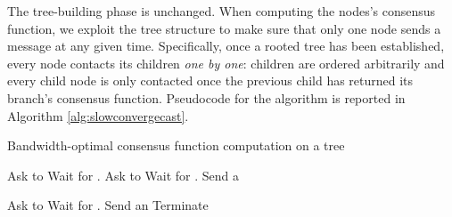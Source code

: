 \documentclass[letterpaper,10pt,conference]{ieeeconf}
\begin{document}
The tree-building phase is unchanged. When computing the nodes's consensus function, we exploit the tree structure to make sure that only one node sends a message at any given time. Specifically, once a rooted tree has been established, every node contacts its children \emph{one by one}: children are ordered arbitrarily and every child node is only contacted once the previous child has returned its branch's consensus function.
Pseudocode for the algorithm is reported in Algorithm \ref{alg:slowconvergecast}.

\begin{algorithm}
\caption{Bandwidth-optimal consensus function computation on a tree} \label{alg:slowconvergecast}
\begin{algorithmic}
\renewcommand{\algorithmicrequire}{\textbf{Input:}}
\renewcommand{\algorithmicensure}{\textbf{Output:}}

\Require  {}
\State  {}
\State  {}
\State  {}
\State  {}

\State{}
\EndIf


	\State Ask  to 
	\State Wait for  .
	\State  {}
\EndFor
{} 
	\State Ask  to 
	\State Wait for  .
\Else
\State Send  a 
\EndIf
\EndProcedure

\State {}
	\State Ask  to 
	\State Wait for  .
\EndFor
{}
\State Send  an 
\EndIf
\State Terminate
\EndProcedure

\State 
\EndFunction

\end{algorithmic}
\end{algorithm}
\end{document}
